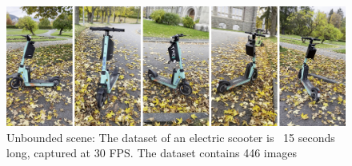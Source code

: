 \begin{figure}[!h]
    \centering
    \includegraphics[width=1.0\textwidth]{figures/tier.png}
    \caption{Unbounded scene: The dataset of an electric scooter is ~15 seconds long, captured at 30 FPS. The dataset contains 446 images}
    \label{fig:tier}
\end{figure}
